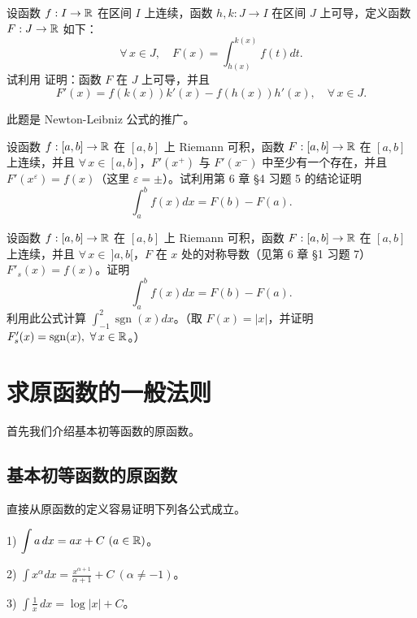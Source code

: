 \begin{exercise}
	\item 设函数 \(f:I\to\mathbb{R}\) 在区间 \(I\) 上连续，函数 \(h,k:J\to I\) 在区间 \(J\) 上可导，定义函数 \(F:J\to\mathbb{R}\) 如下：
	\[
	\forall\,x\in J,\quad F(x)=\int_{h(x)}^{k(x)}f(t)dt.
	\]
	试利用 证明：函数 \(F\) 在 \(J\) 上可导，并且
	\[
	F'(x)=f(k(x))k'(x)-f(h(x))h'(x),\quad\forall\,x\in J.
	\]
\end{exercise}

\begin{exercise}
	\item 此题是 Newton-Leibniz 公式的推广。

	设函数 \(f:[a,b]\to\mathbb{R}\) 在 \([a,b]\) 上 Riemann 可积，函数 \(F:[a,b]\to\mathbb{R}\) 在 \([a,b]\) 上连续，并且 \(\forall\,x\in[a,b]\)，\(F'(x^+)\) 与 \(F'(x^-)\) 中至少有一个存在，并且 \(F'(x^\varepsilon)=f(x)\)（这里 \(\varepsilon=\pm\)）。试利用第 6 章 §4 习题 5 的结论证明
	\[
	\int_a^b f(x)dx=F(b)-F(a).
	\]
\end{exercise}

\begin{exercise}
	\item 设函数 \(f:[a,b]\to\mathbb{R}\) 在 \([a,b]\) 上 Riemann 可积，函数 \(F:[a,b]\to\mathbb{R}\) 在 \([a,b]\) 上连续，并且 \(\forall\,x\in\ ]a,b[\)，\(F\) 在 \(x\) 处的对称导数（见第 6 章 §1 习题 7）\(F'_s(x)=f(x)\)。证明
	\[
	\int_a^b f(x)dx=F(b)-F(a).
	\]
	利用此公式计算 \(\displaystyle\int_{-1}^2\operatorname{sgn}(x)dx\)。（取 \(F(x)=|x|\)，并证明 \(F'_s(x)=\operatorname{sgn}(x),\ \forall\,x\in\R\)。）
\end{exercise}

\section{求原函数的一般法则}

首先我们介绍基本初等函数的原函数。

\subsection{基本初等函数的原函数}

直接从原函数的定义容易证明下列各公式成立。

1) \(\displaystyle\int a\,dx=ax+C\ (a\in\R)\)。

2) \(\displaystyle\int x^\alpha dx=\frac{x^{\alpha+1}}{\alpha+1}+C\ (\alpha\neq-1)\)。

3) \(\displaystyle\int\frac1x\,dx=\log|x|+C\)。

